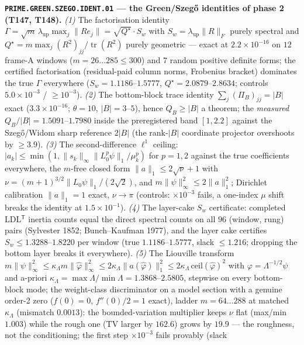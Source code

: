 \documentclass[11pt,a4paper]{article}
\begin{document}
\par\smallskip\noindent\textbf{\texttt{PRIME.GREEN.SZEGO.IDENT.01} --- the
Green/Szeg\H{o} identities of phase 2 (T147, T148).}
\emph{(1)} The factorisation identity
$\Gamma=\sqrt m\,\lambda_{\mathrm{up}}\max_j\|Re_j\|=\sqrt{Q^\star}\cdot S_w$
with $S_w=\lambda_{\mathrm{up}}\|R\|_F$ purely spectral and
$Q^\star=m\max_j(R^2)_{jj}/\operatorname{tr}(R^2)$ purely geometric ---
exact at $2.2\times10^{-16}$ on $12$ frame-A windows ($m=26\ldots285\le300$)
and $7$ random positive definite forms; the certified factorisation
(residual-paid column norms, Frobenius bracket) dominates the true $\Gamma$
everywhere ($S_w=1.1186$--$1.5777$, $Q^\star=2.0879$--$2.8634$; controls
$5.0\times10^{-3}$ / $\ge10^{-3}$). \emph{(2)} The bottom-block trace
identity $\sum_j(\Pi_B)_{jj}=|B|$ exact ($3.3\times10^{-16}$; $\theta=10$,
$|B|=3$--$5$), hence $Q_B\ge|B|$ a theorem; the \emph{measured}
$Q_B/|B|=1.5091$--$1.7980$ inside the preregistered band $[1,2.2]$ against
the Szeg\H{o}/Widom sharp reference $2|B|$ (the rank-$|B|$ coordinate
projector overshoots by $\ge3.9$). \emph{(3)} The second-difference $\ell^1$
ceiling: $|a_k|\le\min(1,\|s_k\|_\infty\|L_0^p\psi\|_1/\mu_k^p)$ for
$p=1,2$ against the true coefficients everywhere, the $m$-free closed form
$\|a\|_1\le2\sqrt\nu+1$ with $\nu=(m+1)^{3/2}\|L_0\psi\|_1/(2\sqrt2)$, and
$m\|\psi\|_\infty^2\le2\|a\|_1^2$; Dirichlet calibration $\|a\|_1=1$ exact,
$\nu\to\pi$ (controls: $\times10^{-3}$ fails, a one-index $\mu$ shift
breaks the identity at $1.5\times10^{-1}$). \emph{(4)} The layer-cake $S_w$
certificate: completed LDL$^{\mathsf T}$ inertia counts equal the direct
spectral counts on all $96$ (window, rung) pairs (Sylvester 1852;
Bunch--Kaufman 1977), and the layer cake certifies $S_w\le1.3288$--$1.8220$
per window (true $1.1186$--$1.5777$, slack $\le1.216$; dropping the bottom
layer breaks it everywhere). \emph{(5)} The Liouville transform
$m\|\psi\|_\infty^2\le\kappa_\Lambda m\|\hat\varphi\|_\infty^2\le
2\kappa_\Lambda\|a(\hat\varphi)\|_1^2\le
2\kappa_\Lambda\,\mathrm{ceil}(\hat\varphi)^2$ with
$\varphi=\Lambda^{-1/2}\psi$ and a-priori
$\kappa_\Lambda=\max\Lambda/\min\Lambda=1.3868$--$2.5805$, stepwise on every
bottom-block mode; the weight-class discriminator on a model section with a
genuine order-2 zero ($f(0)=0$, $f''(0)/2=1$ exact), ladder $m=64\ldots288$
at matched $\kappa_\Lambda$ (mismatch $0.0013$): the bounded-variation
multiplier keeps $\nu$ flat (max/min $1.003$) while the rough one
($\mathrm{TV}$ larger by $162.6$) grows by $19.9$ --- the roughness, not
the conditioning; the first step $\times10^{-3}$ fails provably (slack
\end{document}
